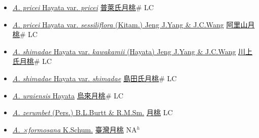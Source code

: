 \begin{itemize}
\begin{itemize}
        \item[] \href{http://www.theplantlist.org/tpl1.1/search?q=Alpinia+pricei+var.+pricei}{\textit{A. pricei} Hayata var. \textit{pricei}}   \href{\detokenize{http://taibnet.sinica.edu.tw/chi/taibnet_species_list.php?T2=普萊氏月桃&T2_new_value=true&fr=y}}{普萊氏月桃}\# LC
        \item[] \href{http://www.theplantlist.org/tpl1.1/search?q=Alpinia+pricei+var.+sessiliflora}{\textit{A. pricei} Hayata var. \textit{sessiliflora} (Kitam.) Jeng J.Yang \& J.C.Wang}   \href{\detokenize{http://taibnet.sinica.edu.tw/chi/taibnet_species_list.php?T2=阿里山月桃&T2_new_value=true&fr=y}}{阿里山月桃}\# LC
        \item[] \href{http://www.theplantlist.org/tpl1.1/search?q=Alpinia+shimadae+var.+kawakamii}{\textit{A. shimadae} Hayata var. \textit{kawakamii} (Hayata) Jeng J.Yang \& J.C.Wang}   \href{\detokenize{http://taibnet.sinica.edu.tw/chi/taibnet_species_list.php?T2=川上氏月桃&T2_new_value=true&fr=y}}{川上氏月桃}\# LC
        \item[] \href{http://www.theplantlist.org/tpl1.1/search?q=Alpinia+shimadae+var.+shimadae}{\textit{A. shimadae} Hayata var. \textit{shimadae}}   \href{\detokenize{http://taibnet.sinica.edu.tw/chi/taibnet_species_list.php?T2=島田氏月桃&T2_new_value=true&fr=y}}{島田氏月桃}\# LC
        \item[] \href{http://www.theplantlist.org/tpl1.1/search?q=Alpinia+uraiensis}{\textit{A. uraiensis} Hayata}   \href{\detokenize{http://taibnet.sinica.edu.tw/chi/taibnet_species_list.php?T2=烏來月桃&T2_new_value=true&fr=y}}{烏來月桃}\# LC
        \item[] \href{http://www.theplantlist.org/tpl1.1/search?q=Alpinia+zerumbet}{\textit{A. zerumbet} (Pers.) B.L.Burtt \& R.M.Sm.}   \href{\detokenize{http://taibnet.sinica.edu.tw/chi/taibnet_species_list.php?T2=月桃&T2_new_value=true&fr=y}}{月桃} LC
        \item[] \href{http://www.theplantlist.org/tpl1.1/search?q=Alpinia+×formosana}{\textit{A. ×formosana} K.Schum.}   \href{\detokenize{http://taibnet.sinica.edu.tw/chi/taibnet_species_list.php?T2=臺灣月桃&T2_new_value=true&fr=y}}{臺灣月桃} NA$^h$

\end{itemize}
\end{itemize}
